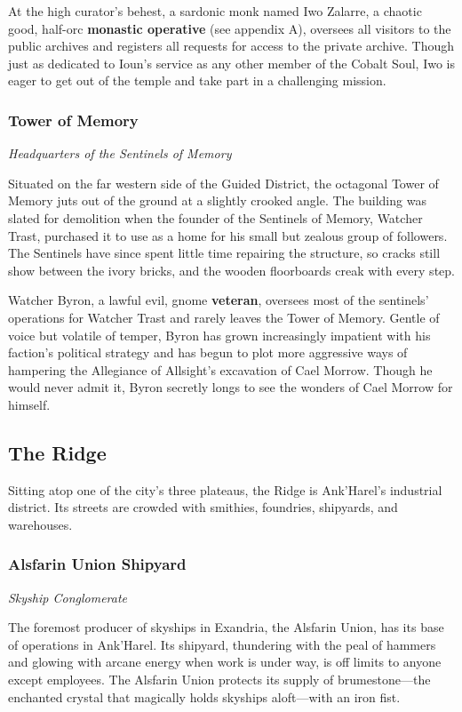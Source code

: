 \documentclass[10pt,a4paper,twoside,fancy,bg=print,twocolumn,openany,nodeprecatedcode]{dndbook}
\begin{document}
At the high curator's behest, a sardonic monk named Iwo Zalarre, a chaotic good, half-orc \textbf{monastic operative} (see appendix A), oversees all visitors to the public archives and registers all requests for access to the private archive. Though just as dedicated to Ioun's service as any other member of the Cobalt Soul, Iwo is eager to get out of the temple and take part in a challenging mission.

\subsubsection{Tower of Memory}
\textit{Headquarters of the Sentinels of Memory}

Situated on the far western side of the Guided District, the octagonal Tower of Memory juts out of the ground at a slightly crooked angle. The building was slated for demolition when the founder of the Sentinels of Memory, Watcher Trast, purchased it to use as a home for his small but zealous group of followers. The Sentinels have since spent little time repairing the structure, so cracks still show between the ivory bricks, and the wooden floorboards creak with every step.

Watcher Byron, a lawful evil, gnome \textbf{veteran}, oversees most of the sentinels' operations for Watcher Trast and rarely leaves the Tower of Memory. Gentle of voice but volatile of temper, Byron has grown increasingly impatient with his faction's political strategy and has begun to plot more aggressive ways of hampering the Allegiance of Allsight's excavation of Cael Morrow. Though he would never admit it, Byron secretly longs to see the wonders of Cael Morrow for himself.

\subsection{The Ridge}
Sitting atop one of the city's three plateaus, the Ridge is Ank'Harel's industrial district. Its streets are crowded with smithies, foundries, shipyards, and warehouses.

\subsubsection{Alsfarin Union Shipyard}
\textit{Skyship Conglomerate}

The foremost producer of skyships in Exandria, the Alsfarin Union, has its base of operations in Ank'Harel. Its shipyard, thundering with the peal of hammers and glowing with arcane energy when work is under way, is off limits to anyone except employees. The Alsfarin Union protects its supply of brumestone—the enchanted crystal that magically holds skyships aloft—with an iron fist.
\end{document}
